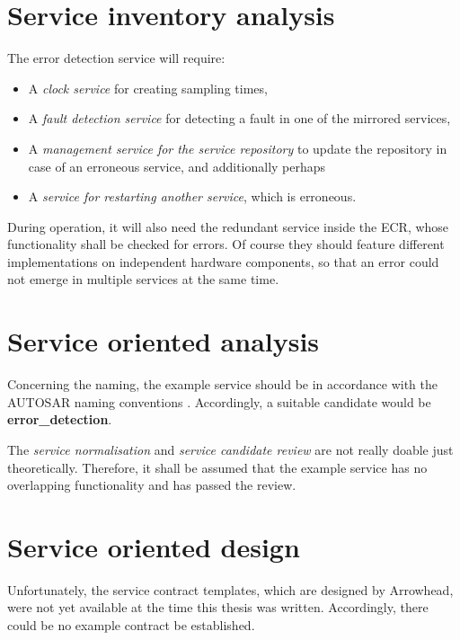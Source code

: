 \section{Service inventory analysis}


The error detection service will require:
\begin{itemize}
\item A \emph{clock service} for creating sampling times,
\item A \emph{fault detection service} for detecting a fault in one of the mirrored services,
\item A \emph{management service for the service repository} to update the repository in case of an erroneous service, and additionally perhaps
\item A \emph{service for restarting another service}, which is erroneous.
\end{itemize}

During operation, it will also need the redundant service inside the ECR, whose functionality shall be checked for errors. Of course they should feature different implementations on independent hardware components, so that an error could not emerge in multiple services at the same time.


\section{Service oriented analysis}


Concerning the naming, the example service should be in accordance with the AUTOSAR naming conventions \cite{autosar_system_modelling}. Accordingly, a suitable candidate would be \textbf{error\_detection}.

The \emph{service normalisation} and \emph{service candidate review} are not really doable just theoretically. Therefore, it shall be assumed that the example service has no overlapping functionality and has passed the review.





\section{Service oriented design}

Unfortunately, the service contract templates, which are designed by Arrowhead, were not yet available at the time this thesis was written. Accordingly, there could be no example contract be established.


